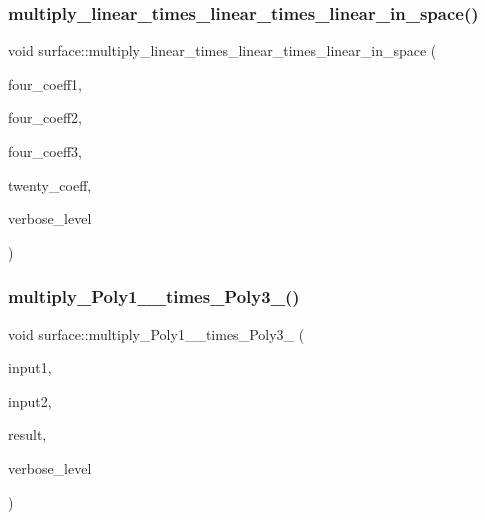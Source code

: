 \subsubsection{\texorpdfstring{multiply\+\_\+linear\+\_\+times\+\_\+linear\+\_\+times\+\_\+linear\+\_\+in\+\_\+space()}{multiply\_linear\_times\_linear\_times\_linear\_in\_space()}}
{\footnotesize\ttfamily void surface\+::multiply\+\_\+linear\+\_\+times\+\_\+linear\+\_\+times\+\_\+linear\+\_\+in\+\_\+space (\begin{DoxyParamCaption}\item[{\mbox{\hyperlink{galois_8h_a09fddde158a3a20bd2dcadb609de11dc}{I\+NT}} $\ast$}]{four\+\_\+coeff1,  }\item[{\mbox{\hyperlink{galois_8h_a09fddde158a3a20bd2dcadb609de11dc}{I\+NT}} $\ast$}]{four\+\_\+coeff2,  }\item[{\mbox{\hyperlink{galois_8h_a09fddde158a3a20bd2dcadb609de11dc}{I\+NT}} $\ast$}]{four\+\_\+coeff3,  }\item[{\mbox{\hyperlink{galois_8h_a09fddde158a3a20bd2dcadb609de11dc}{I\+NT}} $\ast$}]{twenty\+\_\+coeff,  }\item[{\mbox{\hyperlink{galois_8h_a09fddde158a3a20bd2dcadb609de11dc}{I\+NT}}}]{verbose\+\_\+level }\end{DoxyParamCaption})}

\mbox{\label{classsurface_a917115f60a2e692c83431909e504dfd9}} 
\subsubsection{\texorpdfstring{multiply\+\_\+\+Poly1\+\_\+\_\+times\+\_\+\+Poly3\+\_()}{multiply\_Poly1\_3\_times\_Poly3\_3()}}
{\footnotesize\ttfamily void surface\+::multiply\+\_\+\+Poly1\+\_\+\_\+times\+\_\+\+Poly3\+\_ (\begin{DoxyParamCaption}\item[{\mbox{\hyperlink{galois_8h_a09fddde158a3a20bd2dcadb609de11dc}{I\+NT}} $\ast$}]{input1,  }\item[{\mbox{\hyperlink{galois_8h_a09fddde158a3a20bd2dcadb609de11dc}{I\+NT}} $\ast$}]{input2,  }\item[{\mbox{\hyperlink{galois_8h_a09fddde158a3a20bd2dcadb609de11dc}{I\+NT}} $\ast$}]{result,  }\item[{\mbox{\hyperlink{galois_8h_a09fddde158a3a20bd2dcadb609de11dc}{I\+NT}}}]{verbose\+\_\+level }\end{DoxyParamCaption})}

